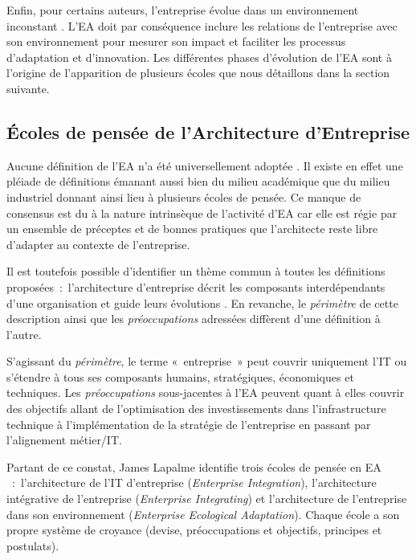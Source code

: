 Enfin, pour certains auteurs, l'entreprise évolue dans un environnement inconstant \cite{lapalme2012three}. L'EA doit par conséquence inclure les relations de l'entreprise avec son environnement pour mesurer son impact et faciliter les processus d'adaptation et d'innovation. Les différentes phases d'évolution de l'EA  sont à l'origine de l'apparition de plusieurs écoles que nous détaillons dans la section suivante.


	\subsection{Écoles de pensée de l'Architecture d'Entreprise} 
	\label{Lapalme}

Aucune définition de l'EA n'a été universellement adoptée \cite{mentz2012comparison} \cite{ranganathan2005enterprise}. Il existe en effet une pléiade de définitions émanant aussi bien du milieu académique que du milieu industriel donnant ainsi lieu à plusieurs écoles de pensée. Ce manque de consensus est du à la nature intrinsèque de l'activité d'EA car elle est régie par un ensemble de préceptes et de bonnes pratiques que l'architecte reste libre d'adapter au contexte de l'entreprise. 

Il est toutefois possible d'identifier un thème commun à toutes les définitions 
proposées~:~l'architecture d'entreprise décrit les composants interdépendants 
d'une organisation et guide leurs évolutions \cite{lapalme2012three}. En 
revanche, le \textit{périmètre} de cette description ainsi que les \textit{préoccupations} adressées diffèrent d'une définition à l'autre.

S'agissant du \textit{périmètre}, le terme «~entreprise~» peut couvrir uniquement l'IT  ou s'étendre à tous ses composants humains, stratégiques, économiques et techniques. Les \textit{préoccupations} sous-jacentes à l'EA peuvent quant à elles couvrir des objectifs allant de l'optimisation des investissements dans l'infrastructure technique à l'implémentation de la stratégie de l'entreprise en passant par l'alignement métier/IT. 

Partant de ce constat, James Lapalme identifie trois écoles de pensée en EA \cite{lapalme2012three}~:~l'architecture de l'IT d'entreprise (\textit{Enterprise Integration}), l'architecture intégrative de l'entreprise (\textit{Enterprise Integrating}) et l'architecture de l'entreprise dans son environnement (\textit{Enterprise Ecological Adaptation}). Chaque école a son propre système de croyance (devise, préoccupations et objectifs, principes et postulats).


